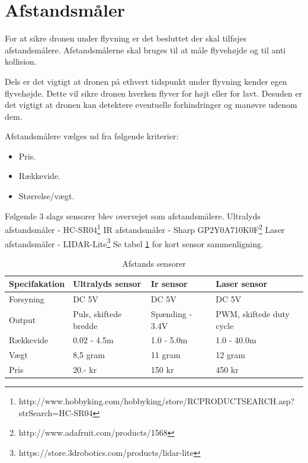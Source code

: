 \section{Afstandsmåler}

For at sikre dronen under flyvning er det besluttet der skal tilføjes afstandsmålere. Afstandsmålerne skal bruges til at måle flyvehøjde og til anti kollision.

Dels er det vigtigt at dronen på ethvert tidspunkt under flyvning kender egen flyvehøjde. Dette vil sikre dronen hverken flyver for højt eller for lavt. Desuden er det vigtigt at dronen kan detektere eventuelle forhindringer og manøvre udenom dem.

Afstandsmålere vælges ud fra følgende kriterier:  
\begin{itemize}
	\item Pris.
	\item Rækkevide. 
	\item Størrelse/vægt. 
\end{itemize}

\vspace{0.5cm}

Følgende 3 slags sensorer blev overvejet som afstandsmålere. 
\newline Ultralyds afstandsmåler - HC-SR04\footnote{http://www.hobbyking.com/hobbyking/store/RC\textunderscore PRODUCT\textunderscore SEARCH.asp?strSearch=HC-SR04}  
\newline IR afstandsmåler - Sharp GP2Y0A710K0F\footnote{http://www.adafruit.com/products/1568}  \newline Laser afstandsmåler - LIDAR-Lite\footnote{https://store.3drobotics.com/products/lidar-lite}  \newline Se tabel \ref{tab:Afstands_sensorer} for kort sensor sammenligning.

\begin{table}[H]
	\centering
		\begin{tabular}{|p{2.8cm}|p{3.4 cm}|p{3.4 cm}|p{3.4 cm}|} 
		\hline
			\textbf{Specifakation} 	& \textbf{Ultralyds sensor} 	& \textbf{Ir sensor} 		& \textbf{Laser sensor} \\ \hline
			 Forsyning 				& DC 5V 						& DC 5V 					& DC 5V \\ \hline			 
			 Output 				& Puls, \newline skiftede bredde 		& Spænding \newline 1.4 - 3.4V 		& PWM, \newline skiftede duty cycle\\ \hline
			 Rækkevide 					& 0.02 - 4.5m 					& 1.0 - 5.0m 				& 1.0 - 40.0m \\ \hline
			 Vægt 					& 8,5 gram 						& 11 gram 					& 12 gram \\ \hline
		 	 Pris 					& 20.- kr 						& 150 kr 					& 450 kr \\ \hline			 
		\end{tabular}
	\caption{Afstands sensorer}
	\label{tab:Afstands_sensorer}
\end{table}

